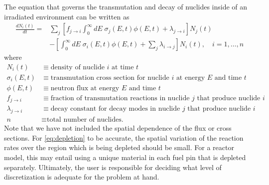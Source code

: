 \documentclass[3p,authoryear]{elsarticle}
\begin{document}
The equation that governs the transmutation and decay of nuclides inside of an
irradiated environment can be written as
\begin{equation}
  \label{eq:depletion}
  \begin{split}
  \frac{dN_i(t)}{dt} = &\sum\limits_j \left [ f_{j \rightarrow i}
  \int_0^\infty dE \; \sigma_j (E, t) \phi(E,t) + \lambda_{j\rightarrow i}
  \right ] N_j(t) \\ &- \left [\int_0^\infty dE \; \sigma_i (E,t) \phi(E,t) +
  \sum\limits_j \lambda_{i\rightarrow j} \right ] N_i(t), \quad i=1,\dots,n
  \end{split}
\end{equation}
where
\begin{equation*}
  \begin{split}
  N_i(t) &\equiv \text{density of nuclide $i$ at time $t$} \\
  \sigma_i(E,t) &\equiv \text{transmutation cross section for nuclide $i$ at energy $E$ and time $t$} \\
  \phi(E,t) &\equiv \text{neutron flux at energy $E$ and time $t$} \\
  f_{j \rightarrow i} &\equiv \text{fraction of transmutation reactions in nuclide $j$ that produce nuclide $i$} \\
  \lambda_{j \rightarrow i} &\equiv \text{decay constant for decay modes in nuclide $j$ that produce nuclide $i$} \\
  n &\equiv \text{total number of nuclides.}
  \end{split}
\end{equation*}
Note that we have not included the spatial dependence of the flux or cross
sections. For \cref{eq:depletion} to be accurate, the spatial variation of the
reaction rates over the region which is being depleted should be small. For a
reactor model, this may entail using a unique material in each fuel pin that is
depleted separately. Ultimately, the user is responsible for deciding what level
of discretization is adequate for the problem at hand.
\end{document}
